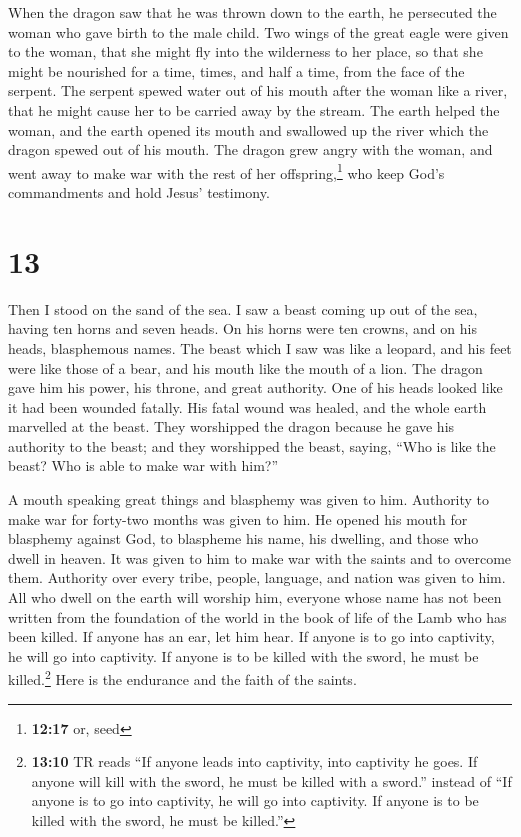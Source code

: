  When the dragon saw that he was thrown down to the
earth, he persecuted the woman who gave birth to the male child.
 Two wings of the great eagle were given to the woman,
that she might fly into the wilderness to her place, so that she might
be nourished for a time, times, and half a time, from the face of the
serpent.  The serpent spewed water out of his mouth after
the woman like a river, that he might cause her to be carried away by
the stream.  The earth helped the woman, and the earth
opened its mouth and swallowed up the river which the dragon spewed out
of his mouth.  The dragon grew angry with the woman, and
went away to make war with the rest of her offspring,\footnote{\textbf{12:17}
  or, seed} who keep God's commandments and hold Jesus' testimony.

\hypertarget{section-12}{%
\section{13}\label{section-12}}

 Then I stood on the sand of the sea. I saw a beast coming
up out of the sea, having ten horns and seven heads. On his horns were
ten crowns, and on his heads, blasphemous names.  The
beast which I saw was like a leopard, and his feet were like those of a
bear, and his mouth like the mouth of a lion. The dragon gave him his
power, his throne, and great authority.  One of his heads
looked like it had been wounded fatally. His fatal wound was healed, and
the whole earth marvelled at the beast.  They worshipped
the dragon because he gave his authority to the beast; and they
worshipped the beast, saying, ``Who is like the beast? Who is able to
make war with him?''

 A mouth speaking great things and blasphemy was given to
him. Authority to make war for forty-two months was given to him.
 He opened his mouth for blasphemy against God, to
blaspheme his name, his dwelling, and those who dwell in heaven.
 It was given to him to make war with the saints and to
overcome them. Authority over every tribe, people, language, and nation
was given to him.  All who dwell on the earth will worship
him, everyone whose name has not been written from the foundation of the
world in the book of life of the Lamb who has been killed.
 If anyone has an ear, let him hear.  If
anyone is to go into captivity, he will go into captivity. If anyone is
to be killed with the sword, he must be killed.\footnote{\textbf{13:10}
  TR reads ``If anyone leads into captivity, into captivity he goes. If
  anyone will kill with the sword, he must be killed with a sword.''
  instead of ``If anyone is to go into captivity, he will go into
  captivity. If anyone is to be killed with the sword, he must be
  killed.''} Here is the endurance and the faith of the saints.


